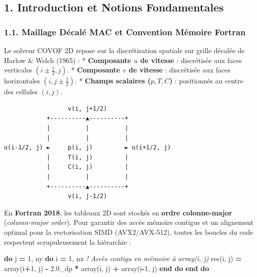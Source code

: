 \documentclass[
  french,
]{article}
\newenvironment{Shaded}{}{}
\newcommand{\CommentTok}[1]{\textcolor[rgb]{0.38,0.63,0.69}{\textit{#1}}}
\newcommand{\DecValTok}[1]{\textcolor[rgb]{0.25,0.63,0.44}{#1}}
\newcommand{\FloatTok}[1]{\textcolor[rgb]{0.25,0.63,0.44}{#1}}
\newcommand{\KeywordTok}[1]{\textcolor[rgb]{0.00,0.44,0.13}{\textbf{#1}}}
\newcommand{\NormalTok}[1]{#1}
\begin{document}
\subsection{1. Introduction et Notions
Fondamentales}\label{introduction-et-notions-fondamentales}

\subsubsection{1.1. Maillage Décalé MAC et Convention Mémoire
Fortran}\label{maillage-duxe9caluxe9-mac-et-convention-muxe9moire-fortran}

Le solveur COVOF 2D repose sur la discrétisation spatiale sur grille
décalée de Harlow \& Welch (1965) : * \textbf{Composante \(u\) de
vitesse} : discrétisée aux faces verticales \((i \pm \frac{1}{2}, j)\).
* \textbf{Composante \(v\) de vitesse} : discrétisée aux faces
horizontales \((i, j \pm \frac{1}{2})\). * \textbf{Champs scalaires
(\(p, T, C\))} : positionnés au centre des cellules \((i, j)\).

\begin{verbatim}
                  v(i, j+1/2)
            +----------▲----------+
            |          |          |
            |          |          |
u(i-1/2, j) ►     p(i, j)         ► u(i+1/2, j)
            |     T(i, j)         |
            |     C(i, j)         |
            |          |          |
            +----------▲----------+
                  v(i, j-1/2)
\end{verbatim}

En \textbf{Fortran 2018}, les tableaux 2D sont stockés en \textbf{ordre
colonne-major} (\emph{column-major order}). Pour garantir des accès
mémoire contigus et un alignement optimal pour la vectorisation SIMD
(AVX2/AVX-512), toutes les boucles du code respectent scrupuleusement la
hiérarchie :

\begin{Shaded}
\begin{Highlighting}[]
\KeywordTok{do}\NormalTok{ j }\KeywordTok{=} \DecValTok{1}\NormalTok{, ny}
   \KeywordTok{do}\NormalTok{ i }\KeywordTok{=} \DecValTok{1}\NormalTok{, nx}
      \CommentTok{! Accès contigu en mémoire à array(i, j)}
\NormalTok{      res(i, j) }\KeywordTok{=}\NormalTok{ array(i}\KeywordTok{+}\DecValTok{1}\NormalTok{, j) }\KeywordTok{{-}} \FloatTok{2.0\_dp} \KeywordTok{*}\NormalTok{ array(i, j) }\KeywordTok{+}\NormalTok{ array(i}\KeywordTok{{-}}\DecValTok{1}\NormalTok{, j)}
   \KeywordTok{end do}
\KeywordTok{end do}
\end{Highlighting}
\end{Shaded}
\end{document}

